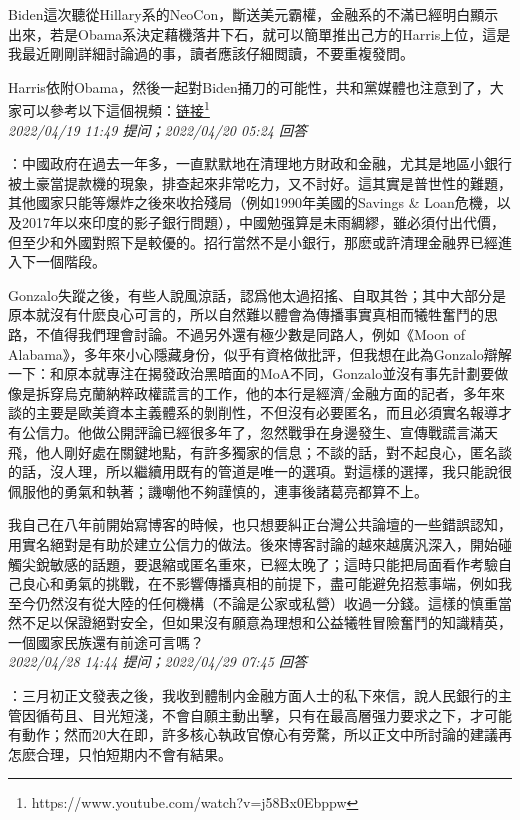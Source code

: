 \documentclass[twocolumn]{ctexart}
\begin{document}
Biden這次聽從Hillary系的NeoCon，斷送美元霸權，金融系的不滿已經明白顯示出來，若是Obama系決定藉機落井下石，就可以簡單推出己方的Harris上位，這是我最近剛剛詳細討論過的事，讀者應該仔細閲讀，不要重複發問。


Harris依附Obama，然後一起對Biden捅刀的可能性，共和黨媒體也注意到了，大家可以參考以下這個視頻：\href{https://www.youtube.com/watch?v=j58Bx0Ebppw}{链接\footnote{\url{https://www.youtube.com/watch?v=j58Bx0Ebppw}}}
\\

\textit{\hfill\noindent\small 2022/04/19 11:49 提问；2022/04/20 05:24 回答}

：中國政府在過去一年多，一直默默地在清理地方財政和金融，尤其是地區小銀行被土豪當提款機的現象，排查起來非常吃力，又不討好。這其實是普世性的難題，其他國家只能等爆炸之後來收拾殘局（例如1990年美國的Savings \& Loan危機，以及2017年以來印度的影子銀行問題），中國勉强算是未雨綢繆，雖必須付出代價，但至少和外國對照下是較優的。招行當然不是小銀行，那麽或許清理金融界已經進入下一個階段。

Gonzalo失蹤之後，有些人說風涼話，認爲他太過招搖、自取其咎；其中大部分是原本就沒有什麽良心可言的，所以自然難以體會為傳播事實真相而犧牲奮鬥的思路，不值得我們理會討論。不過另外還有極少數是同路人，例如《Moon of Alabama》，多年來小心隱藏身份，似乎有資格做批評，但我想在此為Gonzalo辯解一下：和原本就專注在揭發政治黑暗面的MoA不同，Gonzalo並沒有事先計劃要做像是拆穿烏克蘭納粹政權謊言的工作，他的本行是經濟/金融方面的記者，多年來談的主要是歐美資本主義體系的剝削性，不但沒有必要匿名，而且必須實名報導才有公信力。他做公開評論已經很多年了，忽然戰爭在身邊發生、宣傳戰謊言滿天飛，他人剛好處在關鍵地點，有許多獨家的信息；不談的話，對不起良心，匿名談的話，沒人理，所以繼續用既有的管道是唯一的選項。對這樣的選擇，我只能說很佩服他的勇氣和執著；譏嘲他不夠謹慎的，連事後諸葛亮都算不上。

我自己在八年前開始寫博客的時候，也只想要糾正台灣公共論壇的一些錯誤認知，用實名絕對是有助於建立公信力的做法。後來博客討論的越來越廣汎深入，開始碰觸尖銳敏感的話題，要退縮或匿名重來，已經太晚了；這時只能把局面看作考驗自己良心和勇氣的挑戰，在不影響傳播真相的前提下，盡可能避免招惹事端，例如我至今仍然沒有從大陸的任何機構（不論是公家或私營）收過一分錢。這樣的慎重當然不足以保證絕對安全，但如果沒有願意為理想和公益犧牲冒險奮鬥的知識精英，一個國家民族還有前途可言嗎？
\\

\textit{\hfill\noindent\small 2022/04/28 14:44 提问；2022/04/29 07:45 回答}

：三月初正文發表之後，我收到體制内金融方面人士的私下來信，說人民銀行的主管因循苟且、目光短淺，不會自願主動出擊，只有在最高層强力要求之下，才可能有動作；然而20大在即，許多核心執政官僚心有旁騖，所以正文中所討論的建議再怎麽合理，只怕短期内不會有結果。
\end{document}
